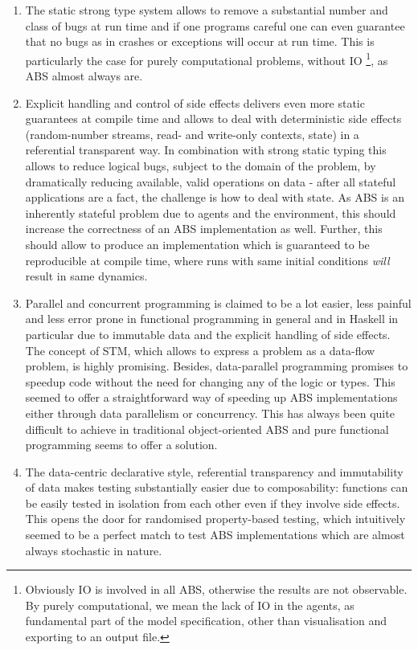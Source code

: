 \begin{enumerate}
	\item The static strong type system allows to remove a substantial number and class of bugs at run time and if one programs careful one can even guarantee that no bugs as in crashes or exceptions will occur at run time. This is particularly the case for purely computational problems, without IO \footnote{Obviously IO is involved in all ABS, otherwise the results are not observable. By purely computational, we mean the lack of IO in the agents, as fundamental part of the model specification, other than visualisation and exporting to an output file.}, as ABS almost always are. 
	
	\item Explicit handling and control of side effects delivers even more static guarantees at compile time and allows to deal with deterministic side effects (random-number streams, read- and write-only contexts, state) in a referential transparent way. In combination with strong static typing this allows to reduce logical bugs, subject to the domain of the problem, by dramatically reducing available, valid operations on data - after all stateful applications are a fact, the challenge is how to deal with state. As ABS is an inherently stateful problem due to agents and the environment, this should increase the correctness of an ABS implementation as well. Further, this should allow to produce an implementation which is guaranteed to be reproducible at compile time, where runs with same initial conditions \textit{will} result in same dynamics.
	
	\item Parallel and concurrent programming is claimed to be a lot easier, less painful and less error prone in functional programming in general and in Haskell in particular due to immutable data and the explicit handling of side effects. The concept of STM, which allows to express a problem as a data-flow problem, is highly promising. Besides, data-parallel programming promises to speedup code without the need for changing any of the logic or types. This seemed to offer a straightforward way of speeding up ABS implementations either through data parallelism or concurrency. This has always been quite difficult to achieve in traditional object-oriented ABS and pure functional programming seems to offer a solution.
	
	\item The data-centric declarative style, referential transparency and immutability of data makes testing substantially easier due to composability: functions can be easily tested in isolation from each other even if they involve side effects. This opens the door for randomised property-based testing, which intuitively seemed to be a perfect match to test ABS implementations which are almost always stochastic in nature.
\end{enumerate}


